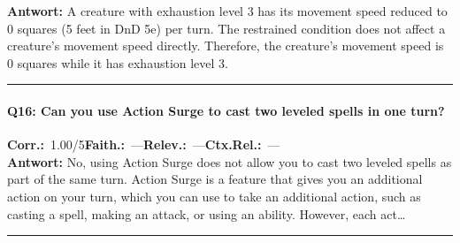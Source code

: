 \noindent\textbf{Antwort:} A creature with exhaustion level 3 has its movement speed reduced to 0 squares (5 feet in DnD 5e) per turn. The restrained condition does not affect a creature's movement speed directly. Therefore, the creature's movement speed is 0 squares while it has exhaustion level 3.

\vspace{4pt}
\hrule
\vspace{6pt}

\paragraph{Q16: Can you use Action Surge to cast two leveled spells in one turn?}
\noindent \textbf{Corr.:}~1.00/5\quad \textbf{Faith.:}~—\quad \textbf{Relev.:}~—\quad \textbf{Ctx.Rel.:}~—\\

\noindent\textbf{Antwort:} No, using Action Surge does not allow you to cast two leveled spells as part of the same turn. Action Surge is a feature that gives you an additional action on your turn, which you can use to take an additional action, such as casting a spell, making an attack, or using an ability. However, each act\ldots

\vspace{4pt}
\hrule
\vspace{6pt}

